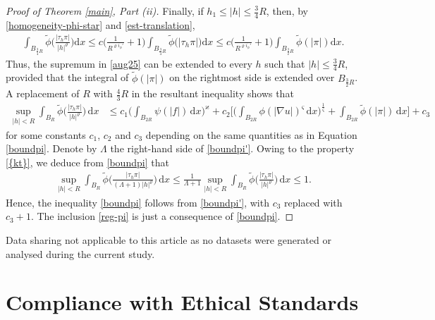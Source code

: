 \documentclass[leqno,11pt]{amsart}%
\numberwithin{equation}{section}
\def\d{\mathrm{d}}
\def\dx{\d x}
\theoremstyle{definition}
\numberwithin{equation}{section}
\begin{document}
\begin{proof}[Proof of Theorem \ref{main}, Part (ii)]
Finally, if $h_1\leq |h|\leq \frac34 R$, then, by \eqref{homogeneity-phi-star} and \eqref{est-translation},
\begin{align}
    \label{oct14}
   \int_{B_{\frac 34R}}\widetilde \phi\bigg(\frac{|\tau_h\pi|}{|h|^\varrho}\bigg)\dx
   \leq 
   c\bigg(\frac 1{R^{\varrho i_\phi'}}+1\bigg)\int_{B_{\frac 34R}}\widetilde \phi\big(|\tau_h\pi|\big)\dx \leq c\bigg(\frac 1{R^{\varrho i_\phi'}}+1\bigg)\int_{B_{\frac 32R}}\widetilde \phi(|\pi|)\dx. 
\end{align}
 Thus,  the supremum in \eqref{aug25} can be extended to every $h$ such that $|h|\le \frac 34R$, provided that the integral of $\widetilde\phi(|\pi|)$ on the rightmost side is extended over $B_{\frac 32R}$. A replacement of $R$ with $\frac 43R$
in the resultant inequality shows that
\begin{align}
    \label{boundpi'}
    \sup_{|h|<R}    \int_{B_{R}}\widetilde \phi\bigg(\frac{|\tau_h\pi|}{|h|^\varrho}\bigg)\, \d x&\le
 c_1 
\bigg(\int_{B_{2R}}\psi(|f|)\,\dx\bigg)^\varkappa  +
c_2 \Bigg[\bigg(\int_{B_{2R}}\phi(|\nabla u|)^\varsigma\,\dx\bigg)^{\frac 1\varsigma} 
 + \int_{B_{2R}}\widetilde\phi(|\pi|)\,\dx\Bigg]
   +c_3
\end{align}
for some constants $c_1$, $c_2$ and $c_3$ depending on the same quantities as in Equation \eqref{boundpi}. Denote by $\Lambda$ the right-hand side of \eqref{boundpi'}. Owing to the property \eqref{{kt}}, we deduce from \eqref{boundpi} that
\begin{align}
        \label{boundpi''}
    \sup_{|h|<R}    \int_{B_{R}}\widetilde \phi\bigg(\frac{|\tau_h\pi|}{(\Lambda +1)|h|^\varrho}\bigg)\, \d x
    \leq \frac{1}{\Lambda +1} \sup_{|h|<R}    \int_{B_{R}}\widetilde \phi\bigg(\frac{|\tau_h\pi|}{|h|^\varrho}\bigg)\, \d x \leq 1.
\end{align}
Hence, the inequality 
\eqref{boundpi} follows from \eqref{boundpi'}, with $c_3$ replaced with $c_3+1$. The inclusion  \eqref{reg-pi} is just a consequence of \eqref{boundpi}.
\end{proof}


 \par{} Data sharing not applicable to this article as no datasets were generated or analysed during the current study.

\section*{Compliance with Ethical Standards}\label{conflicts}
\end{document}
